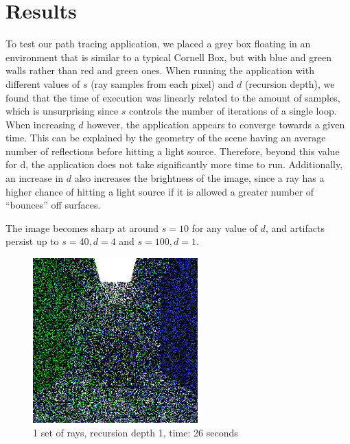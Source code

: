 \documentclass[12pt,journal]{IEEEtran}
\begin{document}
\section{Results}

To test our path tracing application, we placed a grey box floating in an environment that is similar to a typical Cornell Box, but with blue and green walls rather than red and green ones. When running the application with different values of $s$ (ray samples from each pixel) and $d$ (recursion depth), we found that the time of execution was linearly related to the amount of samples, which is unsurprising since $s$ controls the number of iterations of a single loop. When increasing $d$ however, the application appears to converge towards a given time. This can be explained by the geometry of the scene having an average number of reflections before hitting a light source. Therefore, beyond this value for d, the application does not take significantly more time to run. Additionally, an increase in $d$ also increases the brightness of the image, since a ray has a higher chance of hitting a light source if it is allowed a greater number of ``bounces'' off surfaces.

\par
The image becomes sharp at around $s=10$ for any value of $d$, and artifacts persist up to $s=40, d=4$ and $s=100,d=1$.

\begin{figure}[!t]

\centering
\includegraphics[width=2.5in]{1s_1d_26s}
\caption{1 set of rays, recursion depth 1, time: 26 seconds}
\label{1s_1d_26s}

\end{figure}
\end{document}
